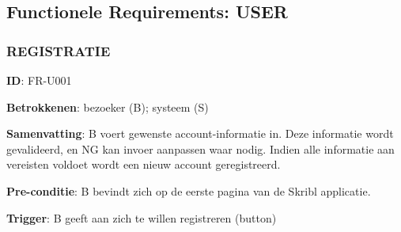 
\subsection{Functionele Requirements: USER}
\vspace{4 mm}


\subsubsection{REGISTRATIE}
\vspace{2 mm}

\textbf{ID}: FR-U001
\vspace{2 mm}

\noindent \textbf{Betrokkenen}: bezoeker (B); systeem (S) 
\vspace{2 mm}

\noindent \textbf{Samenvatting}: B voert gewenste account-informatie in. Deze informatie wordt gevalideerd, en NG kan invoer aanpassen waar nodig. Indien alle informatie aan vereisten voldoet wordt een nieuw account geregistreerd. 
\vspace{2 mm}

\noindent \textbf{Pre-conditie}: B bevindt zich op de eerste pagina van de Skribl applicatie. 
\vspace{2 mm}

\noindent \textbf{Trigger}: B geeft aan zich te willen registreren (button)
\vspace{4 mm}

